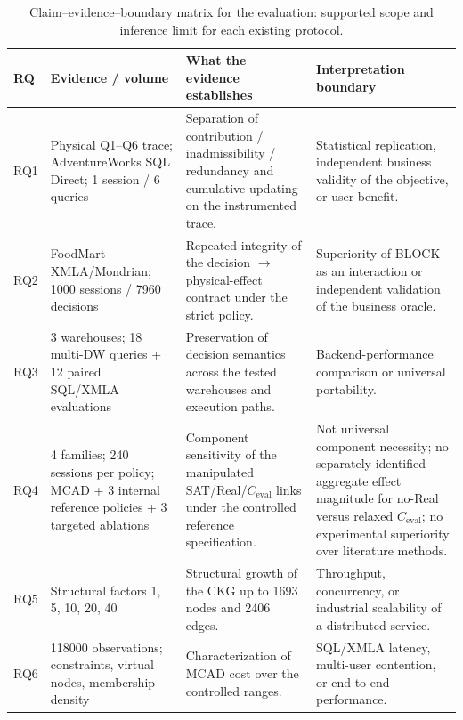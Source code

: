 \begin{table}[!t]
\centering
\caption{Claim--evidence--boundary matrix for the evaluation: supported scope and inference limit for each existing protocol.}
\label{tab:evaluation-scope}
\scriptsize
\setlength{\tabcolsep}{2.0pt}
\renewcommand{\arraystretch}{1.08}
\begin{tabularx}{\textwidth}{@{}p{0.55cm}p{4.25cm}p{5.25cm}X@{}}
\toprule
RQ & Evidence / volume & What the evidence establishes & Interpretation boundary \\
\midrule
RQ1 & Physical Q1--Q6 trace; AdventureWorks SQL Direct; 1 session / 6 queries & Separation of contribution / inadmissibility / redundancy and cumulative updating on the instrumented trace. & Statistical replication, independent business validity of the objective, or user benefit. \\
RQ2 & FoodMart XMLA/Mondrian; 1000 sessions / 7960 decisions & Repeated integrity of the decision $\rightarrow$ physical-effect contract under the strict policy. & Superiority of BLOCK as an interaction or independent validation of the business oracle. \\
RQ3 & 3 warehouses; 18 multi-DW queries + 12 paired SQL/XMLA evaluations & Preservation of decision semantics across the tested warehouses and execution paths. & Backend-performance comparison or universal portability. \\
RQ4 & 4 families; 240 sessions per policy; MCAD + 3 internal reference policies + 3 targeted ablations & Component sensitivity of the manipulated SAT/Real/$C_{\mathrm{eval}}$ links under the controlled reference specification. & Not universal component necessity; no separately identified aggregate effect magnitude for no-Real versus relaxed $C_{\mathrm{eval}}$; no experimental superiority over literature methods. \\
RQ5 & Structural factors 1, 5, 10, 20, 40 & Structural growth of the CKG up to 1693 nodes and 2406 edges. & Throughput, concurrency, or industrial scalability of a distributed service. \\
RQ6 & 118000 observations; constraints, virtual nodes, membership density & Characterization of MCAD cost over the controlled ranges. & SQL/XMLA latency, multi-user contention, or end-to-end performance. \\
\bottomrule
\end{tabularx}
\normalsize
\end{table}
